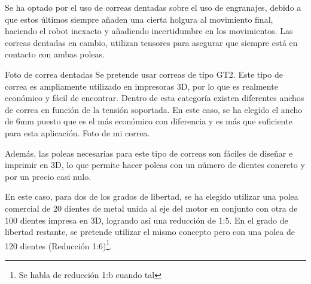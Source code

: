 Se ha optado por el uso de correas dentadas sobre el uso de engranajes, debido a que estos últimos siempre añaden una cierta holgura 
al movimiento final, haciendo el robot inexacto y añadiendo incertidumbre en los movimientos. Las correas dentadas en cambio, utilizan 
tensores para asegurar que siempre está en contacto con ambas poleas.

Foto de correa dentadas
Se pretende usar correas de tipo GT2. Este tipo de correa es ampliamente utilizado en impresoras 3D, por lo que es realmente económico y 
fácil de encontrar. Dentro de esta categoría existen diferentes anchos de correa en función de la tensión soportada. En este caso, 
se ha elegido el ancho de 6mm puesto que es el más económico con diferencia y es más que suficiente para esta aplicación.
Foto de mi correa.

Además, las poleas necesarias para este tipo de correas son fáciles de diseñar e imprimir en 3D, lo que permite hacer poleas con 
un número de dientes concreto y por un precio casi nulo.

En este caso, para dos de los grados de libertad, se ha elegido utilizar una polea comercial de 20 dientes de metal unida al 
eje del motor en conjunto con otra de 100 dientes impresa en 3D, logrando así una reducción de 1:5. En el grado de libertad restante, 
se pretende utilizar el mismo concepto pero con una polea de 120 dientes (Reducción 1:6)\footnote{Se habla de reducción 1:b cuando tal}.

